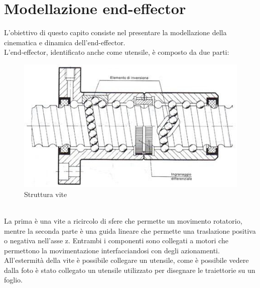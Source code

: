 \section{Modellazione end-effector}\label{DescrizioneEF}
L'obiettivo di questo capito consiste nel presentare la modellazione della cinematica e dinamica dell'end-effector.
\\L'end-effector, identificato anche come utensile, è composto da due parti: 
\begin{figure}[ht]
	\begin{center}
		\includegraphics[scale=0.5]{Immagini/ViteRicircolo}
		\caption{Struttura vite}
	\end{center}
\end{figure}
\\La prima è una vite a ricircolo di sfere che permette un movimento rotatorio, mentre la seconda parte è una guida lineare che permette una traslazione positiva o negativa nell'asse z. Entrambi i componenti sono collegati a motori che permettono la movimentazione interfacciandosi con degli azionamenti. All'estermità della vite è possibile collegare un utensile, come è possibile vedere dalla foto è stato collegato un utensile utilizzato per disegnare le traiettorie su un foglio.

